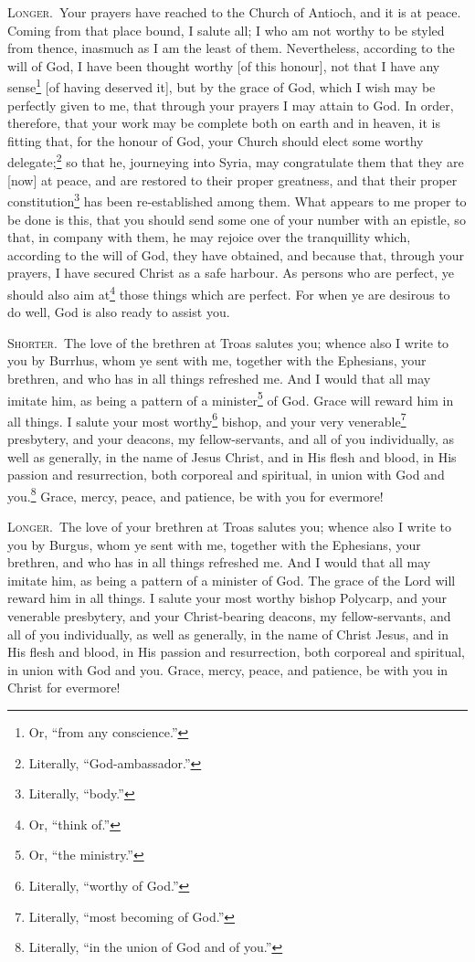 \textsc{Longer.}~Your prayers have reached to the Church of Antioch, and it is at peace. Coming from that place bound, I salute all; I who am not worthy to be styled from thence, inasmuch as I am the least of them. Nevertheless, according to the will of God, I have been thought worthy [of this honour], not that I have any sense\footnote{Or, “from any conscience.”} [of having deserved it], but by the grace of God, which I wish may be perfectly given to me, that through your prayers I may attain to God. In order, therefore, that your work may be complete both on earth and in heaven, it is fitting that, for the honour of God, your Church should elect some worthy delegate;\footnote{Literally, “God-ambassador.”} so that he, journeying into Syria, may congratulate them that they are [now] at peace, and are restored to their proper greatness, and that their proper constitution\footnote{Literally, “body.”} has been re-established among them. What appears to me proper to be done is this, that you should send some one of your number with an epistle, so that, in company with them, he may rejoice over the tranquillity which, according to the will of God, they have obtained, and because that, through your prayers, I have secured Christ as a safe harbour. As persons who are perfect, ye should also aim at\footnote{Or, “think of.”} those things which are perfect. For when ye are desirous to do well, God is also ready to assist you.


\textsc{Shorter.}~The love of the brethren at Troas salutes you; whence also I write to  you by Burrhus, whom ye sent with me, together with the Ephesians, your brethren, and who has in all things refreshed me. And I would that all may imitate him, as being a pattern of a minister\footnote{Or, “the ministry.”} of God. Grace will reward him in all things. I salute your most worthy\footnote{Literally, “worthy of God.”} bishop, and your very venerable\footnote{Literally, “most becoming of God.”} presbytery, and your deacons, my fellow-servants, and all of you individually, as well as generally, in the name of Jesus Christ, and in His flesh and blood, in His passion and resurrection, both corporeal and spiritual, in union with God and you.\footnote{Literally, “in the union of God and of you.”} Grace, mercy, peace, and patience, be with you for evermore!

\textsc{Longer.}~The love of your brethren at Troas salutes you; whence also I write to you by Burgus, whom ye sent with me, together with the Ephesians, your brethren, and who has in all things refreshed me. And I would that all may imitate him, as being a pattern of a minister of God. The grace of the Lord will reward him in all things. I salute your most worthy bishop Polycarp, and your venerable presbytery, and your Christ-bearing deacons, my fellow-servants, and all of you individually, as well as generally, in the name of Christ Jesus, and in His flesh and blood, in His passion and resurrection, both corporeal and spiritual, in union with God and you. Grace, mercy, peace, and patience, be with you in Christ for evermore!

